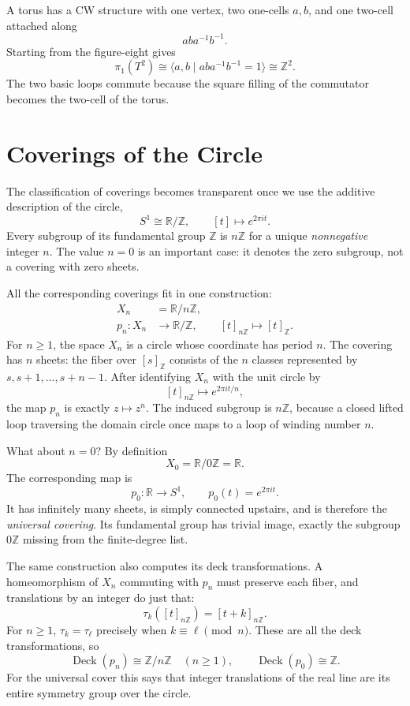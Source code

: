 A torus has a CW structure with one vertex, two one-cells \(a,b\), and one two-cell attached along
\[
  aba^{-1}b^{-1}.
\]
Starting from the figure-eight gives
\[
  \pi_1(T^2)
  \cong
  \langle a,b\mid aba^{-1}b^{-1}=1\rangle
  \cong\mathbb Z^2.
\]
The two basic loops commute because the square filling of the commutator becomes the two-cell of the torus.

\section{Coverings of the Circle}

The classification of coverings becomes transparent once we use the additive description of the circle,
\[
 S^1\cong\mathbb R/\mathbb Z,\qquad
 [t]\longmapsto e^{2\pi it}.
\]
Every subgroup of its fundamental group $\mathbb Z$ is $n\mathbb Z$ for a unique \emph{nonnegative} integer $n$. The value $n=0$ is an important case: it denotes the zero subgroup, not a covering with zero sheets.

All the corresponding coverings fit in one construction:
\[
 \boxed{\begin{aligned}
 X_n&=\mathbb R/n\mathbb Z,\\[-2pt]
 p_n:X_n&\longrightarrow\mathbb R/\mathbb Z,\qquad
           [t]_{n\mathbb Z}\longmapsto[t]_{\mathbb Z}.
 \end{aligned}}
\]
For $n\ge1$, the space $X_n$ is a circle whose coordinate has period $n$. The covering has $n$ sheets: the fiber over $[s]_{\mathbb Z}$ consists of the $n$ classes represented by
$s,s+1,\ldots,s+n-1$. After identifying $X_n$ with the unit circle by
\[
 [t]_{n\mathbb Z}\longmapsto e^{2\pi it/n},
\]
the map $p_n$ is exactly $z\mapsto z^n$. The induced subgroup is $n\mathbb Z$, because a closed lifted loop traversing the domain circle once maps to a loop of winding number $n$.

What about $n=0$? By definition
\[
 X_0=\mathbb R/0\mathbb Z=\mathbb R.
\]
The corresponding map is
\[
 p_0:\mathbb R\longrightarrow S^1,\qquad
 p_0(t)=e^{2\pi it}.
\]
It has infinitely many sheets, is simply connected upstairs, and is therefore the \emph{universal covering}. Its fundamental group has trivial image, exactly the subgroup $0\mathbb Z$ missing from the finite-degree list.

The same construction also computes its deck transformations. A homeomorphism of $X_n$ commuting with $p_n$ must preserve each fiber, and translations by an integer do just that:
\[
 \tau_k([t]_{n\mathbb Z})=[t+k]_{n\mathbb Z}.
\]
For $n\ge1$, $\tau_k=\tau_\ell$ precisely when $k\equiv\ell\pmod n$. These are all the deck transformations, so
\[
 \boxed{\operatorname{Deck}(p_n)\cong\mathbb Z/n\mathbb Z
 \quad(n\ge1),\qquad
 \operatorname{Deck}(p_0)\cong\mathbb Z.}
\]
For the universal cover this says that integer translations of the real line are its entire symmetry group over the circle.

